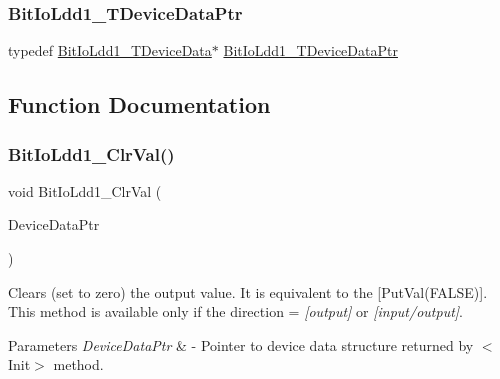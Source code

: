\subsubsection{\texorpdfstring{Bit\+Io\+Ldd1\+\_\+\+T\+Device\+Data\+Ptr}{BitIoLdd1\_TDeviceDataPtr}}
{\footnotesize\ttfamily typedef \hyperlink{struct_bit_io_ldd1___t_device_data}{Bit\+Io\+Ldd1\+\_\+\+T\+Device\+Data}$\ast$ \hyperlink{group___bit_io_ldd1__module_ga340fc98ffd5cf9615926496b47eaa19a}{Bit\+Io\+Ldd1\+\_\+\+T\+Device\+Data\+Ptr}}



\subsection{Function Documentation}
\mbox{\label{group___bit_io_ldd1__module_ga85c0f352eded8016d2e47bf13c10e14c}} 
\subsubsection{\texorpdfstring{Bit\+Io\+Ldd1\+\_\+\+Clr\+Val()}{BitIoLdd1\_ClrVal()}}
{\footnotesize\ttfamily void Bit\+Io\+Ldd1\+\_\+\+Clr\+Val (\begin{DoxyParamCaption}\item[{\hyperlink{group___p_e___types__module_gac5cf1362f1f0e3a2ce71b1bf2276d091}{L\+D\+D\+\_\+\+T\+Device\+Data} $\ast$}]{Device\+Data\+Ptr }\end{DoxyParamCaption})}



Clears (set to zero) the output value. It is equivalent to the \mbox{[}Put\+Val(\+F\+A\+L\+S\+E)\mbox{]}. This method is available only if the direction = {\itshape \mbox{[}output\mbox{]}} or {\itshape \mbox{[}input/output\mbox{]}}. 


\begin{DoxyParams}{Parameters}
{\em Device\+Data\+Ptr} & -\/ Pointer to device data structure returned by $<$\+Init$>$ method. \\
\hline
\end{DoxyParams}
\mbox{\label{group___bit_io_ldd1__module_gab3360cb6abf61e5983bee6a39f337789}} 
